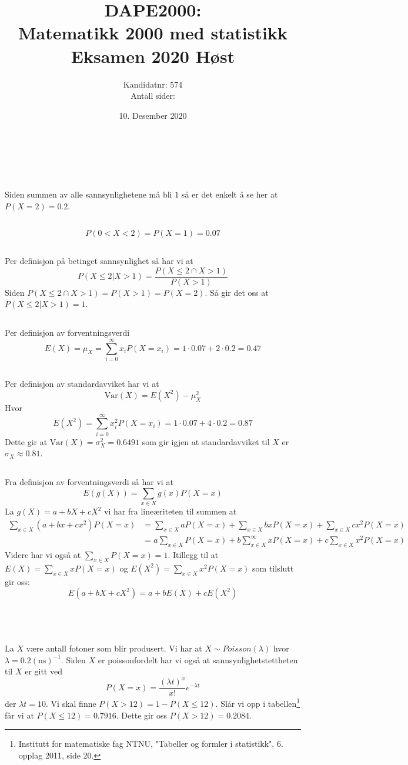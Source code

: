 \documentclass[12pt, a4paper,norsk]{article}
\title
{
	DAPE2000: \\
	Matematikk 2000 med statistikk\\
	Eksamen 2020 Høst
}
\author{Kandidatnr: 574\\Antall sider: \pageref{LastPage}}
\date{10. Desember 2020}
\newcommand{\oppgave}{\,\section{}}
\newcommand{\deloppgave}{\subsection{}}
\newcommand{\prob}[1]{P\left(#1\right)}
\newcommand{\var}[1]{\mathrm{Var}\left(#1\right)}
\newcommand{\expected}[1]{E\left(#1\right)}
\newcommand{\inverse}{^{-1}}
\newcommand{\tabell}[1]{\footnote{
	Institutt for matematiske fag NTNU,
	"Tabeller og formler i statistikk", 
	6. opplag 2011, side #1.}}
\begin{document}
	\maketitle
	\clearpage
	\pagestyle{fancy}
	\oppgave
	Siden summen av alle sannsynlighetene må bli $1$ så er det enkelt å se her at $\prob{X = 2} = 0.2$.
	
	\deloppgave
	$$
	\prob{0 < X < 2} = \prob{X = 1} = 0.07
	$$
	
	\deloppgave
	Per definisjon på betinget sannsynlighet så har vi at 
	$$
	\prob{X \leq 2 | X > 1} = \frac{\prob{X \leq 2 \cap X > 1}}{\prob{X > 1}}
	$$
	Siden $\prob{X \leq 2 \cap X > 1} = \prob{X > 1} = \prob{X = 2}$. Så gir det oss at $\prob{X \leq 2 | X > 1} = 1$.
	
	\deloppgave
	Per definisjon av forventningsverdi
	$$
	\expected{X} = \mu_X = \sum_{i = 0}^\infty x_i\prob{X = x_i} = 1\cdot 0.07 + 2\cdot 0.2 = 0.47
	$$
	
	\deloppgave
	Per definisjon av standardavviket har vi at
	$$
	\var{X} = \expected{X^2} - \mu_X^2
	$$
	Hvor
	$$
	\expected{X^2} = \sum_{i = 0}^\infty x_i^2P(X = x_i) = 1\cdot 0.07 + 4\cdot 0.2 = 0.87
	$$
	Dette gir at $\var{X} = \sigma_X^2 = 0.6491$ som gir igjen at standardavviket til $X$ er $\sigma_X \approx 0.81$.
	
	\deloppgave
	Fra definisjon av forventningsverdi så har vi at
	$$
	\expected{g\left(X\right)} = \sum_{x\in X} g(x)\prob{X = x}
	$$
	La $g\left(X\right) = a + bX + cX^2$ vi har fra lineæriteten til summen at
	\begin{align*}
	\sum_{x\in X} \left(a + bx + cx^2\right)\prob{X = x} &=
	\sum_{x\in X} a\prob{X = x} + \sum_{x\in X} bx\prob{X = x} + \sum_{x\in X} cx^2\prob{X = x}\\
	&= a\sum_{x\in X} \prob{X = x} + b\sum_{x\in X}^\infty x\prob{X = x} + c\sum_{x\in X} x^2\prob{X = x}
	\end{align*}
	Videre har vi også at $\sum_{x\in X}\prob{X = x} = 1$. Itillegg til at $\expected{X} = \sum_{x\in X}x\prob{X = x}$ og $\expected{X^2} = \sum_{x\in X} x^2\prob{X = x}$ som tilslutt gir oss:
	$$
	\expected{a + bX + cX^2} = a + b\expected{X} + c\expected{X^2}
	$$
	
	\oppgave
	\deloppgave
	La $X$ være antall fotoner som blir produsert. Vi har at $X \sim Poisson(\lambda)$ hvor $\lambda = 0.2(\text{ns})\inverse$. Siden $X$ er poissonfordelt har vi også at sannsynlighetstettheten til $X$ er gitt ved
	$$
	\prob{X = x} = \frac{\left(\lambda t\right)^x}{x!}e^{-\lambda t}
	$$
	der $\lambda t = 10$. Vi skal finne $P(X > 12) = 1 - P(X \leq 12)$. Slår vi opp i tabellen\tabell{20} får vi at $P(X\leq 12) = 0.7916$. Dette gir oss $P(X > 12) = 0.2084$.
	
\end{document}
